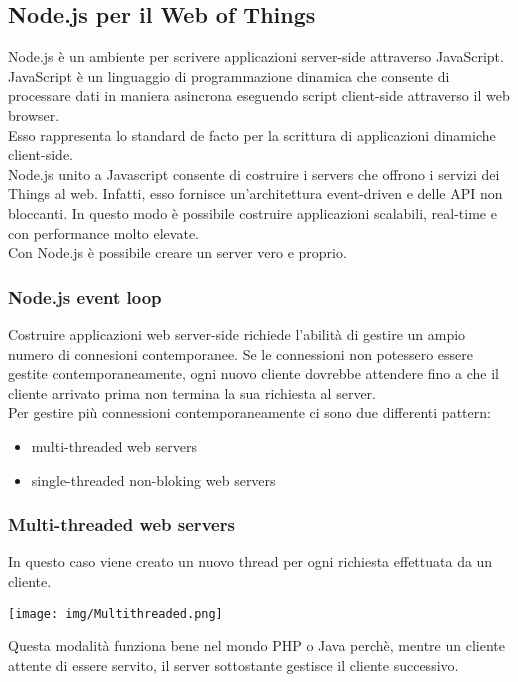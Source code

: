 \documentclass{article}
\begin{document}
\subsection{Node.js per il Web of Things}
Node.js è un ambiente per scrivere applicazioni server-side attraverso JavaScript. \\
JavaScript è un linguaggio di programmazione dinamica che consente di processare dati in maniera asincrona eseguendo script client-side attraverso il web browser. \\ Esso rappresenta lo standard de facto per la scrittura di applicazioni dinamiche client-side. \\
Node.js unito a Javascript consente di costruire i servers che offrono i servizi dei Things al web. Infatti, esso fornisce un'architettura event-driven e delle API non bloccanti. In questo modo è possibile costruire applicazioni scalabili, real-time e con performance molto elevate. \\
Con Node.js è possibile creare un server vero e proprio. 
\subsubsection{Node.js event loop}
Costruire applicazioni web server-side richiede l'abilità di gestire un ampio numero di connesioni contemporanee. Se le connessioni non potessero essere gestite contemporaneamente, ogni nuovo cliente dovrebbe attendere fino a che il cliente arrivato prima non termina la sua richiesta al server. \\
Per gestire più connessioni contemporaneamente ci sono due differenti pattern:
\begin{itemize}
    \item multi-threaded web servers
    \item single-threaded non-bloking web servers
\end{itemize}
\subsubsection{Multi-threaded web servers}
In questo caso viene creato un nuovo thread per ogni richiesta effettuata da un cliente.
\begin{center}
\texttt{[image: img/Multithreaded.png]}
\end{center}
Questa modalità funziona bene nel mondo PHP o Java perchè, mentre un cliente attente di essere servito, il server sottostante gestisce il cliente successivo.
\end{document}
